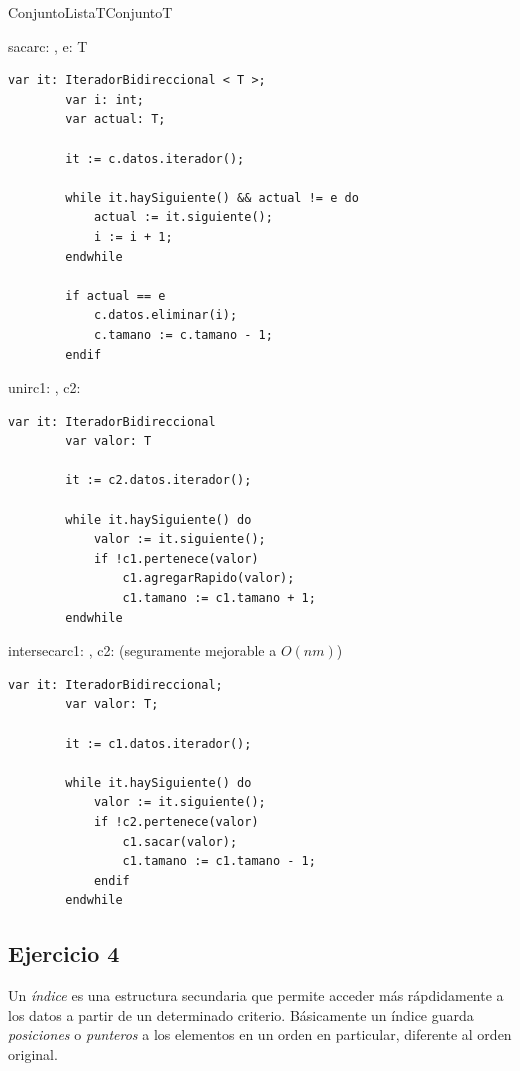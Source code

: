 \begin{module}{ConjuntoLista}{T}{Conjunto}{T}
	\pagebreak

	\begin{proc}{sacar}{\Inout c: \moduletype, \In e: T}{}
		\begin{lstlisting}[numbers=none,frame=none]
		var it: IteradorBidireccional < T >;
		var i: int;
		var actual: T;

		it := c.datos.iterador();
		
		while it.haySiguiente() && actual != e do
			actual := it.siguiente();
			i := i + 1;
		endwhile

		if actual == e
			c.datos.eliminar(i);
			c.tamano := c.tamano - 1;
		endif
		\end{lstlisting}
	\end{proc}

	\begin{proc}{unir}{\Inout c1: \moduletype, \In c2: \moduletype}{}
		\begin{lstlisting}[numbers=none,frame=none]
		var it: IteradorBidireccional
		var valor: T

		it := c2.datos.iterador();

		while it.haySiguiente() do
			valor := it.siguiente();
			if !c1.pertenece(valor)
				c1.agregarRapido(valor);
				c1.tamano := c1.tamano + 1;
		endwhile
		\end{lstlisting}
	\end{proc}

	\begin{proc}{intersecar}{\Inout c1: \moduletype, \In c2: \moduletype}{}
		 (seguramente mejorable a $O(nm)$)
		\begin{lstlisting}[numbers=none,frame=none]
		var it: IteradorBidireccional;
		var valor: T;

		it := c1.datos.iterador();

		while it.haySiguiente() do
			valor := it.siguiente();
			if !c2.pertenece(valor)
				c1.sacar(valor);
				c1.tamano := c1.tamano - 1;
			endif
		endwhile
		\end{lstlisting}
	\end{proc}

\end{module}

\subsection{Ejercicio 4}
Un \textit{índice} es una estructura secundaria que permite acceder más rápdidamente a los datos a partir de un determinado criterio. Básicamente un índice guarda \textit{posiciones} o \textit{punteros} a los elementos en un orden en particular, diferente al orden original.

